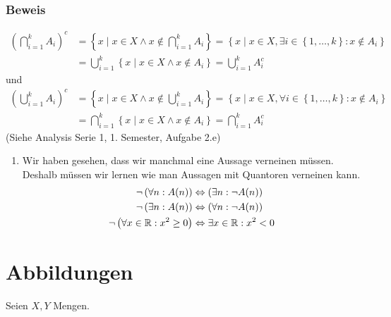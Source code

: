 \subsubsection*{Beweis}
\begin{align*}
{\left( {\bigcap\limits_{i = 1}^k {{A_i}} } \right)^c}
  &=\left\{x \;| \; {x \in X \wedge x\not  \in \bigcap\limits_{i = 1}^k {{A_i}} } \right\} 
  = \left\{ x \;| \; {x \in X, \exists i \in \left\{ {1, \ldots ,k} \right\}:x\not  \in {A_i}} \right\}\\
 &=\bigcup\limits_{i = 1}^k {\left\{ x \;| \; {x \in X \wedge x\not  \in {A_i}} \right\}}   = \bigcup\limits_{i = 1}^k {A_i^c}
\end{align*}
und
\begin{align*}
{\left( {\bigcup\limits_{i = 1}^k {{A_i}} } \right)^c} 
&=\left\{x \;| \; {x \in X \wedge x\not  \in \bigcup\limits_{i = 1}^k {{A_i}} } \right\} 
= \left\{x \;| \; {x \in X, \forall i \in \left\{ {1, \ldots ,k} \right\}:x\not  \in {A_i}} \right\}\\
&=\bigcap\limits_{i = 1}^k {\left\{ {x \;| \;x \in X \wedge x\not  \in {A_i}} \right\}}  
= \bigcap\limits_{i = 1}^k {A_i^c} 
\end{align*}
\noindent (Siehe Analysis Serie 1, 1. Semester, Aufgabe 2.e)
\begin{enumerate}[($\ast$)]
\item Wir haben gesehen, dass wir manchmal eine Aussage verneinen müssen. Deshalb müssen wir lernen wie man Aussagen mit Quantoren verneinen kann.
\begin{align*}
\neg\left(\forall n:A(n)\right)&\Leftrightarrow\left(\exists n:\neg A(n)\right)\\
\neg\left(\exists n:A(n)\right)&\Leftrightarrow\left(\forall n:\neg A(n)\right)\\
\neg\left(\forall x\in \mathbb{R}:x^2\geq 0\right)&\Leftrightarrow\exists x\in\mathbb{R}:x^2<0
\end{align*}
\end{enumerate}
\section{Abbildungen}
Seien $X,Y$ Mengen. 

